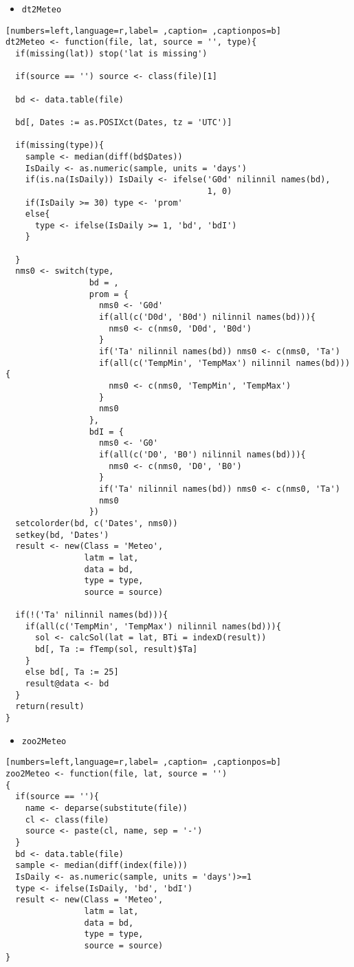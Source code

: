 \begin{itemize}
\item \texttt{dt2Meteo}
\end{itemize}
\begin{lstlisting}[numbers=left,language=r,label= ,caption= ,captionpos=b]
dt2Meteo <- function(file, lat, source = '', type){
  if(missing(lat)) stop('lat is missing')

  if(source == '') source <- class(file)[1]

  bd <- data.table(file)

  bd[, Dates := as.POSIXct(Dates, tz = 'UTC')]

  if(missing(type)){
    sample <- median(diff(bd$Dates))
    IsDaily <- as.numeric(sample, units = 'days')
    if(is.na(IsDaily)) IsDaily <- ifelse('G0d' nilinnil names(bd),
                                         1, 0)
    if(IsDaily >= 30) type <- 'prom'
    else{
      type <- ifelse(IsDaily >= 1, 'bd', 'bdI') 
    }

  }
  nms0 <- switch(type,
                 bd = ,
                 prom = {
                   nms0 <- 'G0d'
                   if(all(c('D0d', 'B0d') nilinnil names(bd))){
                     nms0 <- c(nms0, 'D0d', 'B0d')
                   }
                   if('Ta' nilinnil names(bd)) nms0 <- c(nms0, 'Ta')
                   if(all(c('TempMin', 'TempMax') nilinnil names(bd))){
                     nms0 <- c(nms0, 'TempMin', 'TempMax')
                   }
                   nms0
                 },
                 bdI = {
                   nms0 <- 'G0'
                   if(all(c('D0', 'B0') nilinnil names(bd))){
                     nms0 <- c(nms0, 'D0', 'B0')
                   }
                   if('Ta' nilinnil names(bd)) nms0 <- c(nms0, 'Ta')
                   nms0
                 })
  setcolorder(bd, c('Dates', nms0))
  setkey(bd, 'Dates')
  result <- new(Class = 'Meteo',
                latm = lat,
                data = bd,
                type = type,
                source = source)

  if(!('Ta' nilinnil names(bd))){
    if(all(c('TempMin', 'TempMax') nilinnil names(bd))){
      sol <- calcSol(lat = lat, BTi = indexD(result))
      bd[, Ta := fTemp(sol, result)$Ta]
    }
    else bd[, Ta := 25]
    result@data <- bd
  }
  return(result)
}
\end{lstlisting}
\begin{itemize}
\item \texttt{zoo2Meteo}
\end{itemize}
\begin{lstlisting}[numbers=left,language=r,label= ,caption= ,captionpos=b]
zoo2Meteo <- function(file, lat, source = '')
{
  if(source == ''){
    name <- deparse(substitute(file))
    cl <- class(file)
    source <- paste(cl, name, sep = '-')
  }
  bd <- data.table(file)
  sample <- median(diff(index(file)))
  IsDaily <- as.numeric(sample, units = 'days')>=1
  type <- ifelse(IsDaily, 'bd', 'bdI')
  result <- new(Class = 'Meteo',
                latm = lat,
                data = bd,
                type = type,
                source = source)
}
\end{lstlisting}
